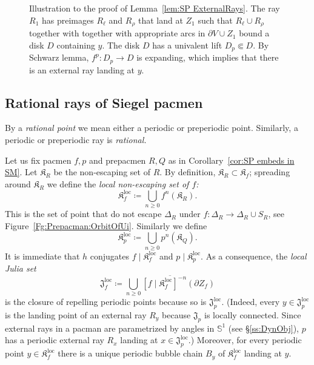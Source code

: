 \documentclass[]{amsart}
\newcommand{\bDelta}{{\mathbb{\Delta}}}
\newcommand\Jul{{\mathfrak J}}
\newcommand\Kfilled{{\mathfrak K}}
\theoremstyle{remark}
\numberwithin{equation}{section}
\theoremstyle{definition}
\def\loc{{\mathrm{loc}}}
\begin{document}
\begin{figure}[t!]
{}
\caption{Illustration to the proof of Lemma~\ref{lem:SP ExternalRays}. The ray $R_1$ has preimages $R_\ell$ and $R_\rho$ that land at $Z_1$ such that $R_\ell \cup R_\rho$ together with together with appropriate arcs in $\partial V\cup Z_1$ bound a disk $D$ containing $y$. The disk $D$ has a univalent lift $D_p\Subset D$. By Schwarz lemma, $f^p\colon D_p \to D$ is expanding, which implies that there is an external ray landing at $y$.}
 
\label{Fg:RatRaysForSiegPacm}
\end{figure}

\subsection{Rational rays of Siegel pacmen}
\label{ss:Ret rays of SP}
By a \emph{rational point}  we mean either a periodic or preperiodic point. Similarly, a periodic or preperiodic  ray is \emph{rational.} 

Let us fix pacmen $f,p$ and prepacmen $R,Q$ as in Corollary~\ref{cor:SP embeds in SM}. Let $\Kfilled_R$ be the non-escaping set of $R$. By definition, $\Kfilled_R\subset \Kfilled_f$; spreading around $\Kfilled_R$ we define the \emph{local non-escaping set of $f$:}
\begin{equation}
\label{eq:K f loc}
\Kfilled^\loc_f\coloneqq \bigcup_{n\ge 0} f^{n}(\Kfilled_R).
\end{equation}
This is the set of point that do not escape $\bDelta_R$ under $f\colon \bDelta_R\to \bDelta_R\cup S_R$, see Figure~\ref{Fg:Prepacman:OrbitOfUi}. Similarly we define  
\[ \Kfilled^\loc_p\coloneqq \bigcup_{n\ge 0} p^{n}(\Kfilled_Q).\]
It is immediate that $h$ conjugates $f\mid \Kfilled^\loc_f$ and $p\mid \Kfilled^\loc_p$. As a consequence, the \emph{local Julia set}
\[\Jul^\loc_f\coloneqq \overline{\bigcup_{n\ge 0} \left[f\mid \Kfilled^\loc_{f}\right]^{-n} (\partial Z_f) }\]
is the closure of repelling periodic points because so is $\Jul^\loc_p$. (Indeed, every $y\in \Jul^\loc_p$ is the landing point of an external ray $R_y$ because $\Jul_p$ is locally connected. Since external rays in a pacman are parametrized by angles in  $\mathbb{S}^1$ (see \S\ref{ss:DynObj}), $p$ has a periodic external ray $R_x$ landing at $x\in \Jul^\loc_p$.) Moreover, for every periodic point $y\in \Kfilled^\loc_f$ there is a unique periodic bubble chain $B_y$ of $\Kfilled^\loc_f$ landing at $y$.
\end{document}
